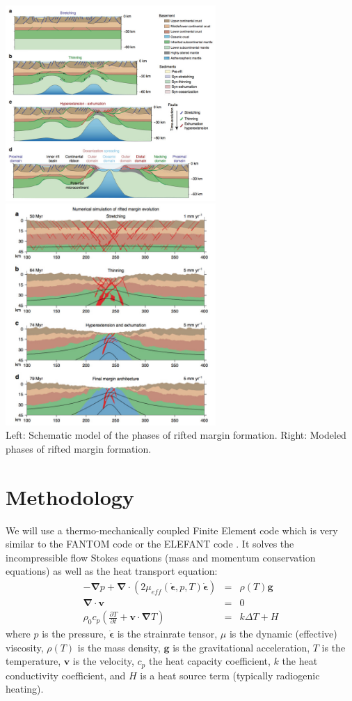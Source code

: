 \begin{center}
\includegraphics[width=8cm]{python_codes/fieldstone_178/images/nabp1.jpg}
\includegraphics[width=8cm]{python_codes/fieldstone_178/images/nabp2.jpg}\\
{\captionfont Left: Schematic model of the phases of rifted margin formation. 
Right: Modeled phases of rifted margin formation. \label{fignabp17}}
\end{center}


\section*{Methodology}

We will use a thermo-mechanically coupled Finite Element code which is very similar to the FANTOM code \cite{thie11} 
or the ELEFANT code \cite{latb17}. It solves the incompressible flow Stokes equations (mass and momentum conservation equations) 
as well as the heat transport equation:
\begin{eqnarray}
-{\bm \nabla}p + {\bm \nabla} \cdot (2\mu_{eff}(\dot{\bm \epsilon},p,T)\dot{\bm \epsilon}) &=& \rho(T) {\bm g} \\
{\bm \nabla}\cdot {\bm v} &=& 0 \\
\rho_0 c_p \left(\frac{\partial T}{\partial t} + {\bm v}\cdot{\bm \nabla} T \right) &=& k \Delta T +H
\end{eqnarray}
where $p$ is the pressure, $\dot{\bm \epsilon}$ is the strainrate tensor, $\mu$ is the dynamic (effective) 
viscosity, $\rho(T)$ is the mass density, ${\bm g}$ is the gravitational acceleration, $T$ is the temperature, 
${\bm v}$ is the velocity, $c_p$ the heat capacity coefficient, $k$ the heat conductivity coefficient, and $H$ 
is a heat source term (typically radiogenic heating).

